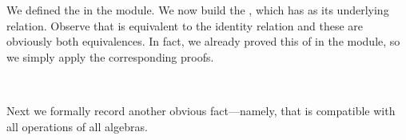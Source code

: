 \ccpad
We defined the   in the  module. We now build the , which has  as its underlying relation. Observe that  is equivalent to the identity relation  and these are obviously both equivalences. In fact, we already proved this of  in the  module, so we simply apply the corresponding proofs.
\ccpad
\begin{code}%
\>[0]\AgdaSpace{}%
\AgdaSymbol{:}\AgdaSpace{}%
\AgdaSymbol{\{}\AgdaSpace{}%
\AgdaSymbol{:}\AgdaSpace{}%
\AgdaSpace{}%
\AgdaSymbol{\}}\AgdaSpace{}%
%
\>[31]\AgdaSpace{}%
\AgdaSymbol{\{}\AgdaSpace{}%
\AgdaSymbol{=}\AgdaSpace{}%
\AgdaSymbol{\}}\AgdaSpace{}%
\<%
\\
\>[0]\AgdaSpace{}%
\AgdaSymbol{=}\AgdaSpace{}%
\AgdaSpace{}%
\AgdaSymbol{\{}\AgdaSpace{}%
\AgdaSymbol{=}\AgdaSpace{}%
\AgdaSymbol{;}\AgdaSpace{}%
\AgdaSpace{}%
\AgdaSymbol{=}\AgdaSpace{}%
\AgdaSymbol{;}\AgdaSpace{}%
\AgdaSpace{}%
\AgdaSymbol{=}\AgdaSpace{}%
\AgdaSymbol{\}}\<%
\end{code}
\ccpad
Next we formally record another obvious fact---namely, that  is compatible with all operations of all algebras.
\ccpad
